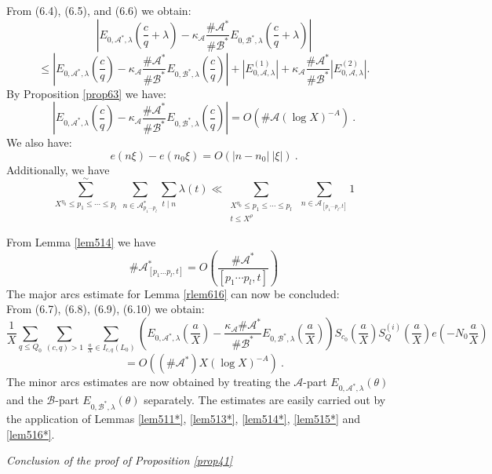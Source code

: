 \documentclass{amsart}
\numberwithin{equation}{subsection}
\begin{document}
From (6.4), (6.5), and (6.6) we obtain:
\[ 
\left| E_{0, \mathcal{A}^*, \lambda}\left(\frac{c}{q}+\lambda\right)- \kappa_{\mathcal{A}}\frac{\#\mathcal{A}^*}{\#\mathcal{B}^*} E_{0, \mathcal{B}^*, \lambda}\left(\frac{c}{q}+\lambda\right)\right|
 \tag{6.7}
\]
$$\leq \left| E_{0, \mathcal{A}^*, \lambda}\left(\frac{c}{q}\right)-\kappa_{\mathcal{A}}\frac{\#\mathcal{A}^*}{\#\mathcal{B}^*} E_{0, \mathcal{B}^*, \lambda}\left(\frac{c}{q}\right)\right|+|E_{0, \mathcal{A}, \lambda}^{(1)}|+\kappa_{\mathcal{A}}\frac{\#\mathcal{A}^*}{\#\mathcal{B}^*} |E_{0, \mathcal{A}, \lambda}^{(2)}|.$$
By Proposition \ref{prop63} we have:
\[
 \left| E_{0, \mathcal{A}^*, \lambda}\left(\frac{c}{q}\right)-\kappa_{\mathcal{A}}\frac{\#\mathcal{A}^*}{\#\mathcal{B}^*} E_{0, \mathcal{B}^*, \lambda}\left(\frac{c}{q}\right)\right|=O\left( \#\mathcal{A}(\log X)^{-A}\right)\:.  \tag{6.8}
\]
We also have:
\[
e(n\xi)-e(n_0\xi)=O(|n-n_0|\:|\xi|)\:.  \tag{6.9}
\]
Additionally, we have
\[
\sum_{X^{\eta_0}\leq p_1\leq \cdots\leq p_l}^{\sim}\: \sum_{n\in \mathcal{A}^*_{p_1\cdots p_l}} \sum_{t\mid n} \lambda(t)\ll \sum_{\substack{X^{\eta_0}\leq p_1\leq \cdots\leq p_l \\ t\leq X^\rho}}\ \sum_{n\in \mathcal{A}_{[p_1\cdots p_l, t]}} 1 \tag{6.10}
\]



From Lemma \ref{lem514} we have
\[
\# \mathcal{A}^*_{[p_1\ldots p_l, t]} = O\left( \frac{\#\mathcal{A}^*}{[p_1\cdots p_l, t]} \right)  \tag{6.11}
\]
The major arcs estimate for Lemma \ref{rlem616} can now be concluded:\\
From (6.7), (6.8), (6.9), (6.10) we obtain:
$$\frac{1}{X}\sum_{q\leq Q_0}\sum_{(c,q)>1}\sum_{\frac{a}{X}\in I_{c,q}(L_0)} \left( E_{0, \mathcal{A}^*, \lambda}\left(\frac{a}{X}\right) - \frac{\kappa_{\mathcal{A}}\#\mathcal{A}^*}{\#\mathcal{B}^*} E_{0, \mathcal{B}^*, \lambda}\left(\frac{a}{X}\right) \right) S_{c_0}\left(\frac{a}{X}\right) S_Q^{(i)}\left(\frac{a}{X}\right) e\left(-N_0\frac{a}{X}\right)$$
$$ = O\left(  (\#\mathcal{A}^*) X(\log X)^{-A}\right)\:.$$
The minor arcs estimates are now obtained by treating the $\mathcal{A}$-part $E_{0, \mathcal{A}^*, \lambda}(\theta)$ and the $\mathcal{B}$-part $E_{0, \mathcal{B}^*, \lambda}(\theta)$ separately. The estimates are easily carried out by the application of Lemmas \ref{lem511*}, \ref{lem513*}, \ref{lem514*}, \ref{lem515*} and \ref{lem516*}.

\textit{Conclusion of the proof of Proposition \ref{prop41}}
\end{document}
